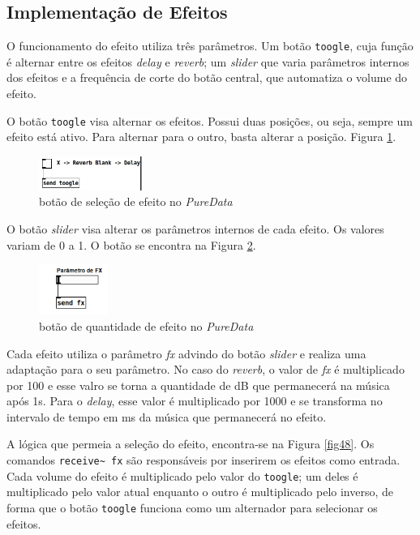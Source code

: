 	\subsection{Implementação de Efeitos}

    O funcionamento do efeito utiliza três parâmetros. Um botão \texttt{toogle}, cuja função é alternar entre os efeitos \textit{delay} e \textit{reverb}; um \textit{slider} que varia parâmetros internos dos efeitos e a frequência de corte do botão central, que automatiza o volume do efeito.

    O botão \texttt{toogle} visa alternar os efeitos. Possui duas posições, ou seja, sempre um efeito está ativo. Para alternar para o outro, basta alterar a posição. Figura \ref{fig46}.

    \begin{figure}[h]
        \centering
        \includegraphics[width=0.3\textwidth]{figuras/fig46.png}
        \caption{botão de seleção de efeito no \textit{PureData}}
        \label{fig46}
    \end{figure}

    O botão \textit{slider} visa alterar os parâmetros internos de cada efeito. Os valores variam de 0 a 1. O botão se encontra na Figura \ref{fig47}.

    \begin{figure}[h]
        \centering
        \includegraphics[width=0.2\textwidth]{figuras/fig47.png}
        \caption{botão de quantidade de efeito no \textit{PureData}}
        \label{fig47}
    \end{figure}

    Cada efeito utiliza o parâmetro \textit{fx} advindo do botão \textit{slider} e realiza uma adaptação para o seu parâmetro. No caso do \textit{reverb}, o valor de \textit{fx} é multiplicado por 100 e esse valro se torna a quantidade de dB que permanecerá na música após 1s. Para o \textit{delay}, esse valor é multiplicado por 1000 e se transforma no intervalo de tempo em ms da música que permanecerá no efeito.

    A lógica que permeia a seleção do efeito, encontra-se na Figura \ref{fig48}. Os comandos \texttt{receive\textasciitilde\ fx} são responsáveis por inserirem os efeitos como entrada. Cada volume do efeito é multiplicado pelo valor do \texttt{toogle}; um deles é multiplicado pelo valor atual enquanto o outro é multiplicado pelo inverso, de forma que o botão \texttt{toogle} funciona como um alternador para selecionar os efeitos. 

